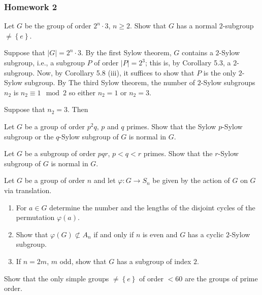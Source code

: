\subsubsection{Homework 2}
\setcounter{exercise}{0}

\begin{problem}
  Let $G$ be the group of order $2^n\cdot 3$, $n\geq 2$. Show that $G$ has
  a normal $2$-subgroup $\neq\left\{e\right\}$.
\end{problem}
\begin{solution}
  Suppose that $|G|=2^n\cdot 3$. By the first Sylow theorem, $G$ contains a
  $2$-Sylow subgroup, i.e., a subgroup $P$ of order $|P|=2^3$; this is, by
  Corollary 5.3, a $2$-subgroup. Now, by Corollary 5.8 (iii), it suffices
  to show that $P$ is the only $2$-Sylow subgroup. By The third Sylow
  theorem, the number of $2$-Sylow subgroups $n_2$ is $n_2\equiv 1\mod 2$
  so either $n_2=1$ or $n_2=3$.

  Suppose that $n_2=3$. Then
\end{solution}

\begin{problem}
  Let $G$ be a group of order $p^2q$, $p$ and $q$ primes. Show that the
  Sylow $p$-Sylow subgroup or the $q$-Sylow subgroup of $G$ is normal in
  $G$.
\end{problem}
\begin{solution}
\end{solution}

\begin{problem}
  Let $G$ be a subgroup of order $pqr$, $p<q<r$ primes. Show that the
  $r$-Sylow subgroup of $G$ is normal in $G$.
\end{problem}
\begin{solution}
\end{solution}

\begin{problem}
  Let $G$ be a group of order $n$ and let $\varphi\colon G\to S_n$ be given
  by the action of $G$ on $G$ via translation.
  \begin{enumerate}[label=(\alph*),noitemsep]
  \item For $a\in G$ determine the number and the lengths of the disjoint
    cycles of the permutation $\varphi(a)$.
  \item Show that $\varphi(G)\nsubset A_n$ if and only if $n$ is even and
    $G$ has a cyclic $2$-Sylow subgroup.
  \item If $n=2m$, $m$ odd, show that $G$ has a subgroup of index $2$.
  \end{enumerate}
\end{problem}
\begin{solution}
\end{solution}

\begin{problem}
  Show that the only simple groups $\neq\left\{e\right\}$ of order $<60$
  are the groups of prime order.
\end{problem}
\begin{solution}
\end{solution}

